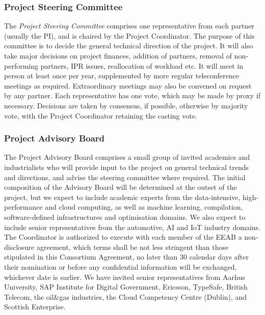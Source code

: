 \documentclass[a4paper,11pt]{article}
\begin{document}
\subsubsection*{Project Steering Committee}
\vspace{-6pt}

The \emph{Project Steering Committee} comprises one representative from each partner
(usually the PI), and is chaired by the Project Coordinator.  
The purpose of this committee is to decide
the general technical direction of the project.  It will also
take major decisions on project finances, addition of partners, removal of non-performing
partners, IPR issues, reallocation of workload etc.  It will meet in person
at least once per year, supplemented by more regular teleconference
meetings as required. Extraordinary meetings may also be convened on request by any partner.
Each representative has one vote, which
may be made by proxy if necessary.  Decisions are taken by
consensus, if possible, otherwise by majority vote, with the
Project Coordinator retaining the casting vote.

\subsubsection*{Project Advisory Board}
\vspace{-6pt}

The Project Advisory Board comprises a small group of invited
academics and industrialists who will provide input to the
project on general technical trends and directions, and advise
the steering committee where required.  The initial composition
of the Advisory Board will be determined at the outset of the
project, but we expect to include academic experts from the data-intensive, high-performance and cloud computing, as well as machine learning, compilation, software-defined infrastructures and optimisation domains. We also expect to include senior representatives from the automotive, AI and IoT industry domains. The Coordinator is authorized to 
execute with each member of the EEAB a non-disclosure agreement, which 
terms shall be not less stringent than those stipulated in this 
Consortium Agreement, no later than 30 calendar days after their nomination 
or before any confidential information will be exchanged, whichever date is earlier. 
We have invited senior representatives from Aarhus University, SAP Institute for Digital Government, Ericsson, TypeSafe, British Telecom,
the oil\&gas industries, the Cloud Competency Centre (Dublin),
	and Scottish Enterprise.
\end{document}
